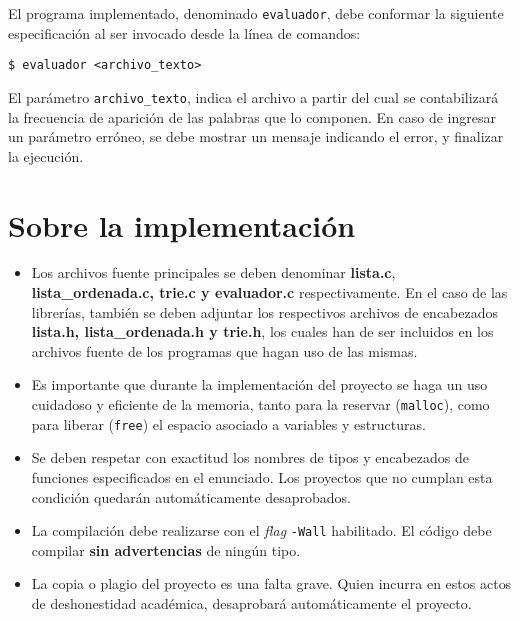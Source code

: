 \documentclass[12pt,a4paper]{article}
\begin{document}
El programa implementado, denominado \texttt{evaluador}, debe conformar la siguiente especificación al ser invocado desde la línea de comandos:

\begin{center}	
	\texttt{\$ evaluador <archivo\_texto> }
\end{center}

El parámetro \texttt{archivo\_texto}, indica el archivo a partir del cual se contabilizará la frecuencia de aparición de las palabras que lo componen. En caso de ingresar un parámetro erróneo, se debe mostrar un mensaje indicando el error, y finalizar la ejecución.
	
\section*{Sobre la implementación}
\begin{itemize}
	\item Los archivos fuente principales se deben denominar \textbf{\textsf{lista.c}}, \textbf{\textsf{lista\_ordenada.c}, \textsf{trie.c} y \textsf{evaluador.c}} respectivamente. En el caso de las librerías, también se deben adjuntar los respectivos archivos de encabezados \textbf{\textsf{lista.h}, \textbf{\textsf{lista\_ordenada.h}} y \textsf{trie.h}}, los cuales han de	ser incluidos en los archivos fuente de los programas que hagan uso de las mismas.
	
	\item Es importante que durante la implementación del proyecto se haga un uso
	cuidadoso y eficiente de la memoria, tanto para la reservar
	(\texttt{malloc}), como para liberar (\texttt{free}) el espacio asociado a
	variables y estructuras.
	
	\item Se deben respetar con exactitud los nombres de tipos y encabezados de
	funciones especificados en el enunciado. Los proyectos que no cumplan esta condición quedarán automáticamente desaprobados.
	
	\item La compilación debe realizarse con el \emph{flag} \texttt{-Wall} habilitado. El código debe compilar \textbf{sin advertencias} de ningún tipo.
	
	\item La copia o plagio del proyecto es una falta grave. Quien incurra en estos actos de deshonestidad académica, desaprobará automáticamente el proyecto.
\end{itemize}
\end{document}
